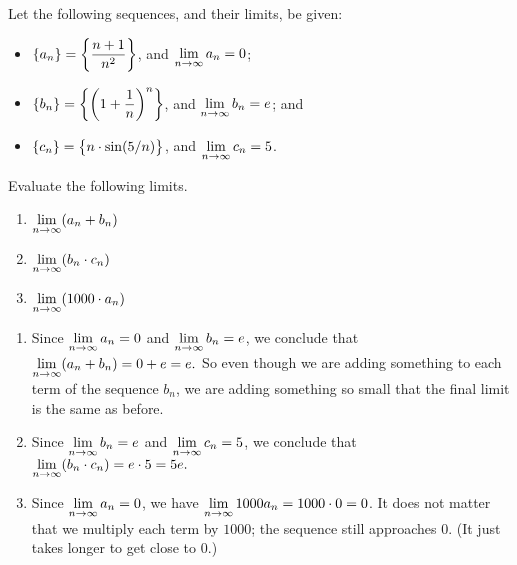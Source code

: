 \begin{example} \label{eg:7.1.4} %
Let the following sequences, and their limits, be given:

\begin{itemize}
\item $\displaystyle \{a_n\} = \left\{\frac{n+1}{n^2}\right\}$, and $\displaystyle \lim_{n\to\infty} a_n = 0$;
\item $\displaystyle \{b_n\} = \left\{\left(1+\frac1n\right)^{n}\right\}$, and $\displaystyle \lim_{n\to\infty} b_n = e$; and
\item $\displaystyle \{c_n\} = \big\{n\cdot \sin (5/n)\big\}$, and $\displaystyle \lim_{n\to\infty} c_n = 5$.
\end{itemize}

Evaluate the following limits.

\begin{enumerate}[1)]
\item $\displaystyle \lim_{n\to\infty} (a_n+b_n)$ 
\item $\displaystyle \lim_{n\to\infty} (b_n\cdot c_n)$ 
\item $\displaystyle \lim_{n\to\infty} (1000\cdot a_n)$
\end{enumerate}

\solution
\begin{enumerate}[1)] 
\item Since $\displaystyle \lim_{n\to\infty} a_n = 0$ and $\displaystyle \lim_{n\to\infty} b_n = e$, we conclude that $\displaystyle \lim_{n\to\infty} (a_n+b_n) = 0+e = e.$ So even though we are adding something to each term of the sequence $b_n$, we are adding something so small that the final limit is the same as before.

\item Since $\displaystyle \lim_{n\to\infty} b_n = e$ and $\displaystyle \lim_{n\to\infty} c_n = 5$, we conclude that $\displaystyle \lim_{n\to\infty} (b_n\cdot c_n) = e\cdot 5 = 5e.$

\item Since $\displaystyle \lim_{n\to\infty} a_n = 0$, we have $\displaystyle \lim_{n\to\infty} 1000a_n =1000\cdot 0 = 0$. It does not matter that we multiply each term by $1000$; the sequence still approaches $0$. (It just takes longer to get close to $0$.)
\end{enumerate}
\end{example}